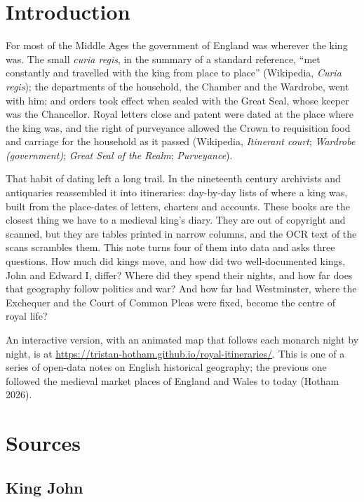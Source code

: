 \documentclass[11pt,a4paper]{article}
\begin{document}
\section{Introduction}

For most of the Middle Ages the government of England was wherever the king was. The small \textit{curia regis}, in the summary of a standard reference, ``met constantly and travelled with the king from place to place'' (Wikipedia, \textit{Curia regis}); the departments of the household, the Chamber and the Wardrobe, went with him; and orders took effect when sealed with the Great Seal, whose keeper was the Chancellor. Royal letters close and patent were dated at the place where the king was, and the right of purveyance allowed the Crown to requisition food and carriage for the household as it passed (Wikipedia, \textit{Itinerant court}; \textit{Wardrobe (government)}; \textit{Great Seal of the Realm}; \textit{Purveyance}).

That habit of dating left a long trail. In the nineteenth century archivists and antiquaries reassembled it into itineraries: day-by-day lists of where a king was, built from the place-dates of letters, charters and accounts. These books are the closest thing we have to a medieval king's diary. They are out of copyright and scanned, but they are tables printed in narrow columns, and the OCR text of the scans scrambles them. This note turns four of them into data and asks three questions. How much did kings move, and how did two well-documented kings, John and Edward I, differ? Where did they spend their nights, and how far does that geography follow politics and war? And how far had Westminster, where the Exchequer and the Court of Common Pleas were fixed, become the centre of royal life?

An interactive version, with an animated map that follows each monarch night by night, is at \url{https://tristan-hotham.github.io/royal-itineraries/}. This is one of a series of open-data notes on English historical geography; the previous one followed the medieval market places of England and Wales to today (Hotham 2026).

\section{Sources}

\subsection{King John}
\end{document}
